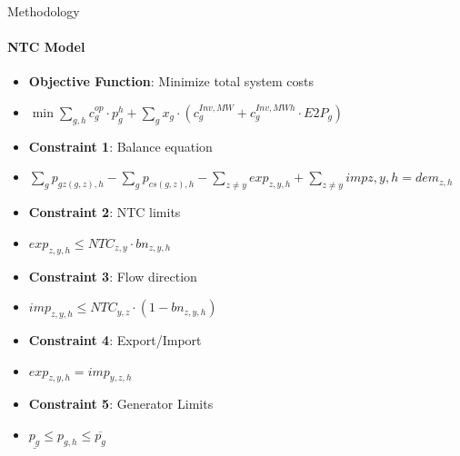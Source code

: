 \documentclass[aspectratio=169]{beamer}
\begin{document}
\begin{frame}{Methodology}
    \framesubtitle{NTC Model}
 
    \begin{itemize}
        \item \textbf{Objective Function}: Minimize total system costs
        \vspace{-0.3cm}
        \item[] \begin{center}
                \footnotesize$\min \sum_{g,h} c_{g}^{op} \cdot p_g^{h} + \sum_{g} x_g \cdot (c_{g}^{Inv,MW} + c_{g}^{Inv,MWh} \cdot E2P_g)$
                \end{center}
        \vspace{-0.15cm}
        \item \textbf{Constraint 1}: Balance equation
        \vspace{-0.3cm}
        \item[] \begin{center}
                \footnotesize$\sum_{g} p_{gz(g,z),h} - \sum_{g} p_{cs(g,z),h} - \sum_{z \neq y} exp_{z,y,h} + \sum_{z \neq y} imp{z,y,h} = dem_{z,h}$
                \end{center}
        \vspace{-0.15cm}
        \item \textbf{Constraint 2}: NTC limits
        \vspace{-0.3cm}
        \item[] \begin{center}
                \footnotesize$exp_{z,y,h} \leq NTC_{z,y} \cdot bn_{z,y,h}$
                \end{center}
        \vspace{-0.15cm}
        \item \textbf{Constraint 3}: Flow direction
        \vspace{-0.3cm}
        \item[] \begin{center}
                \footnotesize$imp_{z,y,h} \leq NTC_{y,z} \cdot (1-bn_{z,y,h})$
                \end{center}
        \vspace{-0.15cm}
        \item \textbf{Constraint 4}: Export/Import
        \vspace{-0.3cm}
        \item[] \begin{center}
                \footnotesize$exp_{z,y,h} = imp_{y,z,h}$
                \end{center}
        \vspace{-0.15cm}
        \item \textbf{Constraint 5}: Generator Limits
        \vspace{-0.3cm}
        \item[] \begin{center}
                \footnotesize$\underline{p_g} \leq p_{g,h} \leq \overline{p_g}$
                \end{center}
    \end{itemize}

\end{frame}
\end{document}
